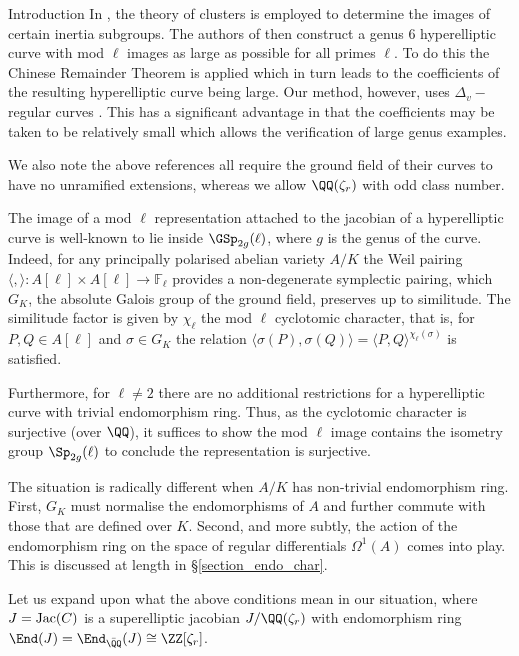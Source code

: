 \documentclass[11pt,a4paper]{article}
\newcommand{\Fl}{\mathbb{F}_\ell}
\newcommand{\Dv}{\Delta_v}
\newcommand{\Qr}{{\QQ(\zeta_r)}}
\newcommand{\Zr}{{\ZZ[\zeta_r]}}
\begin{document}
\begin{section}{Introduction}
In \cite{Anni_VDok}, the theory of clusters \cite{M2D2} is employed to determine the images of certain inertia subgroups.
The authors of \cite{Anni_VDok} then construct a genus 6 hyperelliptic curve with mod $\ell$ images as large as possible for all primes $\ell$.
To do this the Chinese Remainder Theorem is applied which in turn leads to the coefficients of the resulting hyperelliptic curve being large.
Our method, however, uses $\Dv-$regular curves \cite{Models_Curves_DVR}. This has a significant advantage in that the coefficients may be taken to be relatively small which allows the verification of large genus examples.

We also note the above references all require the ground field of their curves to have no unramified extensions, whereas we allow $\Qr$ with odd class number.

The image of a mod $\ell$ representation attached to the jacobian of a hyperelliptic curve is well-known to lie inside $\GSp_{2g}(\ell)$, where $g$ is the genus of the curve.
Indeed, for any principally polarised abelian variety $A/K$ the Weil pairing $\langle,\rangle \colon A[\ell]\times A[\ell] \rightarrow \Fl$ provides a non-degenerate symplectic pairing, which $G_K$, the absolute Galois group of the ground field, preserves up to similitude.
The similitude factor is given by $\chi_\ell$ the mod $\ell$ cyclotomic character, that is, for $P,Q\in A[\ell]$ and $\sigma \in G_K$ the relation $\langle \sigma(P), \sigma(Q) \rangle = \langle P, Q \rangle^{\chi_\ell(\sigma)}$ is satisfied.

Furthermore, for $\ell \neq 2$ there are no additional restrictions for a hyperelliptic curve with trivial endomorphism ring.
Thus, as the cyclotomic character is surjective (over $\QQ$), it suffices to show the mod $\ell$ image contains the isometry group $\Sp_{2g}(\ell)$ to conclude the representation is surjective.

The situation is radically different when $A/K$ has non-trivial endomorphism ring.
First, $G_K$ must normalise the endomorphisms of $A$ and further commute with those that are defined over $K$.
Second, and more subtly, the action of the endomorphism ring on the space of regular differentials $\Omega^1(A)$ comes into play.
This is discussed at length in \S \ref{section_endo_char}.

Let us expand upon what the above conditions mean in our situation, where $J={\rm Jac}(C)$ is a superelliptic jacobian $J/\Qr$ with endomorphism ring $\End(J) = \End_{\Bar{\QQ}}(J) \cong \Zr$.


\end{section}
\end{document}
